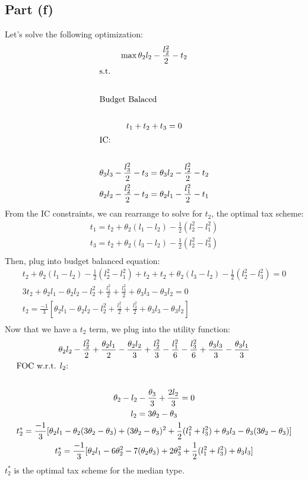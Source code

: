 \documentclass[10pt,a4paper]{article}
\begin{document}
  \subsection*{Part (f)}
    Let's solve the following optimization:
    \begin{gather*}
      \max \theta_2l_2 - \frac{l_2^2}{2} - t_2 \\
      \shortintertext{s.t.} \\
      \shortintertext{Budget Balaced} \\
      t_1 + t_2 + t_3 = 0 \\
      \shortintertext{IC:} \\
      \theta_3l_3 - \frac{l_3^2}{2} - t_3 = \theta_3l_2 - \frac{l_2^2}{2} - t_2 \\
      \theta_2l_2 - \frac{l_2^2}{2} - t_2 = \theta_2l_1 - \frac{l_1^2}{2} - t_1 \\
    \end{gather*}
    From the IC constraints, we can rearrange to solve for $t_2$, the optimal tax scheme:
    \begin{gather*}
      t_1 = t_2 + \theta_2(l_1 - l_2) - \frac{1}{2}(l_2^2 - l_1^2) \\
      t_3 = t_2 + \theta_2(l_3 - l_2) - \frac{1}{2}(l_2^2 - l_3^2) \\
    \end{gather*}
    Then, plug into budget balanced equation:
    \begin{gather*}
      t_2 + \theta_2(l_1 - l_2) - \frac{1}{2}(l_2^2 - l_1^2) + t_2 + t_2 + \theta_2(l_3 - l_2) - \frac{1}{2}(l_2^2 - l_3^2) = 0 \\
      3t_2 + \theta_2l_1 - \theta_2l_2 - l_2^2 + \frac{l_1^2}{2} + \frac{l_3^2}{2} + \theta_3l_3 - \theta_3l_2 = 0 \\
      t_2 = \frac{-1}{3}[\theta_2l_1 - \theta_2l_2 - l_2^2 + \frac{l_1^2}{2} + \frac{l_3^2}{2} + \theta_3l_3 - \theta_3l_2] \\
    \end{gather*}
    Now that we have a $t_2$ term, we plug into the utility function:
    \begin{gather*}
      \theta_2l_2 - \frac{l_2^2}{2} + \frac{\theta_2l_1}{2} - \frac{\theta_2l_2}{3} + \frac{l_2^2}{3} - \frac{l_1^2}{6} - \frac{l_3^2}{6} + \frac{\theta_3l_3}{3} - \frac{\theta_3l_1}{3} \\
      \shortintertext{FOC w.r.t. $l_2$:} \\
      \theta_2 - l_2 - \frac{\theta_3}{3} + \frac{2l_2}{3} = 0 \\
      l_2 = 3\theta_2 - \theta_3 \\
      t_2^* = \frac{-1}{3}[\theta_2l_1 - \theta_2(3\theta_2 - \theta_3) + (3\theta_2 - \theta_3)^2 + \frac{1}{2}(l_1^2 + l_3^2) + \theta_3l_3 - \theta_3(3\theta_2 - \theta_3)] \\
      t_2^* = \frac{-1}{3}[\theta_2l_1 - 6\theta_2^2 - 7(\theta_2\theta_3) + 2\theta_3^2 + \frac{1}{2}(l_1^2 + l_3^2) + \theta_3l_3] \\
    \end{gather*}
    $t_2^*$ is the optimal tax scheme for the median type. 
\end{document}
